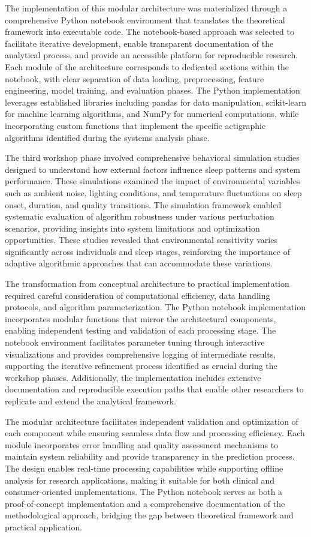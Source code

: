 \documentclass[conference]{IEEEtran}
\begin{document}
The implementation of this modular architecture was materialized through a comprehensive Python notebook environment that translates the theoretical framework into executable code. The notebook-based approach was selected to facilitate iterative development, enable transparent documentation of the analytical process, and provide an accessible platform for reproducible research. Each module of the architecture corresponds to dedicated sections within the notebook, with clear separation of data loading, preprocessing, feature engineering, model training, and evaluation phases. The Python implementation leverages established libraries including pandas for data manipulation, scikit-learn for machine learning algorithms, and NumPy for numerical computations, while incorporating custom functions that implement the specific actigraphic algorithms identified during the systems analysis phase.

The third workshop phase involved comprehensive behavioral simulation studies designed to understand how external factors influence sleep patterns and system performance. These simulations examined the impact of environmental variables such as ambient noise, lighting conditions, and temperature fluctuations on sleep onset, duration, and quality transitions. The simulation framework enabled systematic evaluation of algorithm robustness under various perturbation scenarios, providing insights into system limitations and optimization opportunities. These studies revealed that environmental sensitivity varies significantly across individuals and sleep stages, reinforcing the importance of adaptive algorithmic approaches that can accommodate these variations.

The transformation from conceptual architecture to practical implementation required careful consideration of computational efficiency, data handling protocols, and algorithm parameterization. The Python notebook implementation incorporates modular functions that mirror the architectural components, enabling independent testing and validation of each processing stage. The notebook environment facilitates parameter tuning through interactive visualizations and provides comprehensive logging of intermediate results, supporting the iterative refinement process identified as crucial during the workshop phases. Additionally, the implementation includes extensive documentation and reproducible execution paths that enable other researchers to replicate and extend the analytical framework.

The modular architecture facilitates independent validation and optimization of each component while ensuring seamless data flow and processing efficiency. Each module incorporates error handling and quality assessment mechanisms to maintain system reliability and provide transparency in the prediction process. The design enables real-time processing capabilities while supporting offline analysis for research applications, making it suitable for both clinical and consumer-oriented implementations. The Python notebook serves as both a proof-of-concept implementation and a comprehensive documentation of the methodological approach, bridging the gap between theoretical framework and practical application.
\end{document}
